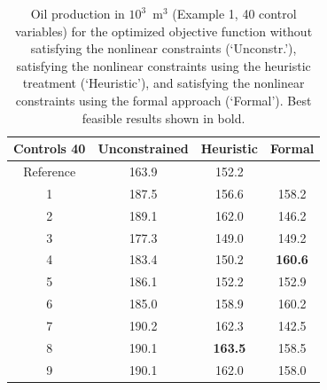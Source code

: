 \documentclass[twocolumn,numbook]{svjour3}          %
\begin{document}
\begin{table}
\centering
\caption{Oil production in $10^3$~m$^3$ (Example 1, 40 control variables) for the optimized objective function
         without satisfying the nonlinear constraints (`Unconstr.'), satisfying the nonlinear constraints
         using the heuristic treatment (`Heuristic'), and satisfying the nonlinear constraints
         using the formal approach (`Formal'). Best feasible results shown in bold.}
\begin{tabular}{|c|c|c|c|}
\hline
  Controls 40  & Unconstrained & Heuristic & Formal                       \\
\hline
Reference    & 163.9         &  152.2                      &                           \\
1                     & 187.5         &  156.6                      &        158.2        \\
2                     & 189.1         &  162.0                      &        146.2        \\
3                     & 177.3         &  149.0                      &        149.2        \\
4                     & 183.4         &  150.2                      & \bf{ 160.6 }      \\
5                     & 186.1         &  152.2                      &        152.9        \\
6                     & 185.0         &  158.9                      &        160.2        \\
7                     & 190.2         &  162.3                      &        142.5        \\ 
8                     & 190.1         &\bf{163.5}                 &        158.5        \\
9                     & 190.1         &     162.0                   &        158.0        \\
\hline
\end{tabular}
  \label{table:PiC500Steps8}
\end{table}
\end{document}
